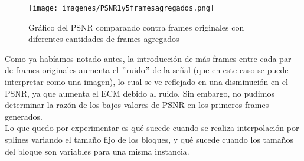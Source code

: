 \begin{figure}[h!]
  \caption{Gráfico del PSNR comparando contra frames originales con diferentes cantidades de frames agregados}
  \centering
    \texttt{[image: imagenes/PSNR1y5framesagregados.png]}
\end{figure}

Como ya habíamos notado antes, la introducción de más frames entre cada par de frames originales aumenta el $"$ruido$"$ de la señal (que en este caso se puede interpretar como una imagen), lo cual se ve reflejado en una disminución en el PSNR, ya que aumenta el ECM debido al ruido. Sin embargo, no pudimos determinar la razón de los bajos valores de PSNR en los primeros frames generados.\\

Lo que quedo por experimentar es qué sucede cuando se realiza interpolación por splines variando el tamaño fijo de los bloques, y qué sucede cuando los tamaños del bloque son variables para una misma instancia.







